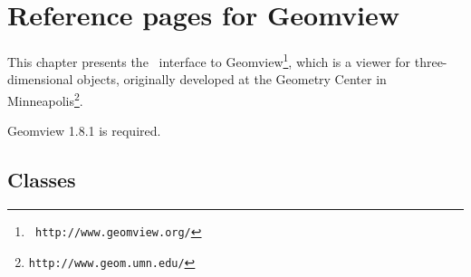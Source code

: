 
\section{Reference pages for Geomview}




This chapter presents the \cgal\ interface to Geomview\footnote{\tt
http://www.geomview.org/}, which is a
viewer for three-dimensional objects, originally developed at the Geometry
Center in Minneapolis\footnote{\tt http://www.geom.umn.edu/}.

Geomview 1.8.1 is required.

\subsection*{Classes}
